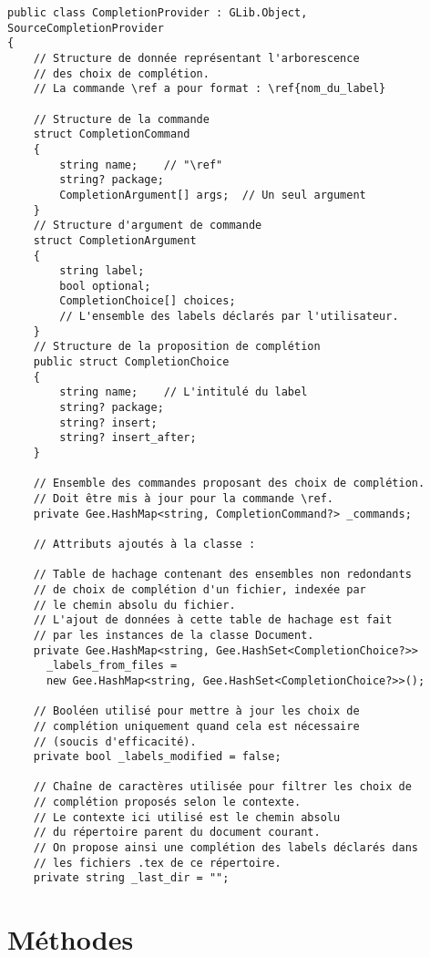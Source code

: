 \documentclass[a4paper,11pt]{report}
\begin{document}
\begin{lstlisting}[frame=single]
public class CompletionProvider : GLib.Object, SourceCompletionProvider
{
    // Structure de donnée représentant l'arborescence
    // des choix de complétion.
    // La commande \ref a pour format : \ref{nom_du_label}
    
    // Structure de la commande
    struct CompletionCommand
    {
        string name;    // "\ref"
        string? package;
        CompletionArgument[] args;  // Un seul argument
    }
    // Structure d'argument de commande
    struct CompletionArgument
    {
        string label;
        bool optional;
        CompletionChoice[] choices;
        // L'ensemble des labels déclarés par l'utilisateur.
    }
    // Structure de la proposition de complétion
    public struct CompletionChoice
    {
        string name;    // L'intitulé du label
        string? package;
        string? insert;
        string? insert_after;
    }
    
    // Ensemble des commandes proposant des choix de complétion.
    // Doit être mis à jour pour la commande \ref.
    private Gee.HashMap<string, CompletionCommand?> _commands;
    
    // Attributs ajoutés à la classe :
    
    // Table de hachage contenant des ensembles non redondants
    // de choix de complétion d'un fichier, indexée par
    // le chemin absolu du fichier.
    // L'ajout de données à cette table de hachage est fait
    // par les instances de la classe Document.
    private Gee.HashMap<string, Gee.HashSet<CompletionChoice?>> 
      _labels_from_files =
      new Gee.HashMap<string, Gee.HashSet<CompletionChoice?>>();
    
    // Booléen utilisé pour mettre à jour les choix de
    // complétion uniquement quand cela est nécessaire
    // (soucis d'efficacité).
    private bool _labels_modified = false;
    
    // Chaîne de caractères utilisée pour filtrer les choix de
    // complétion proposés selon le contexte.
    // Le contexte ici utilisé est le chemin absolu
    // du répertoire parent du document courant.
    // On propose ainsi une complétion des labels déclarés dans
    // les fichiers .tex de ce répertoire.
    private string _last_dir = "";
\end{lstlisting}

\section{Méthodes}
\label{sec:CP_méthodes}
\end{document}
